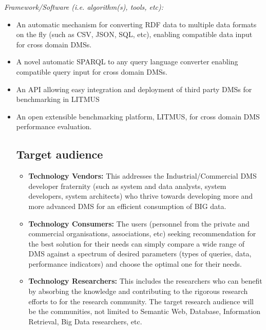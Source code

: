 \documentclass{llncs}
\newcommand{\todoproofread}[3]{
    \todoitemtemplate{#1}{#2}{Please proof read above section; #3}{inline}{yellow}
}
\newcommand{\todoitemtemplate}[5]{%
\todo[#4,color=#5,caption=X]{{#1}{ \textbf{{\tiny{for}} #2}:}{#3}}%
}
\begin{document}
         \textit{Framework/Software (i.e. algorithm(s), tools, etc):} 
        \begin{itemize}[nosep]
            \item An automatic mechanism for converting RDF data to multiple data formats on the fly (such as CSV, JSON, SQL, etc), enabling compatible data input for cross domain DMSs. 
            \item A novel automatic SPARQL to any query language converter enabling compatible query input for cross domain DMSs.
            \item An API allowing easy integration and deployment of third party DMSs for benchmarking in LITMUS
            \item An open extensible benchmarking platform, LITMUS, for cross domain DMS performance evaluation.

    \subsection{Target audience}
        \begin{itemize}[nosep]
            \item \textbf{Technology Vendors:}
            This addresses the Industrial/Commercial DMS developer fraternity (such as system and data analysts, system developers, system architects) who thrive towards developing more and more advanced DMS for an efficient consumption of BIG data.
            \item \textbf{Technology Consumers:}
            The users (personnel from the private and commercial organisations, associations, etc) seeking recommendation for the best solution for their needs can simply compare a wide range of DMS against a spectrum of desired parameters (types of queries, data, performance indicators) and choose the optimal one for their needs. 
            \item \textbf{Technology Researchers:}
            This includes the researchers who can benefit by absorbing the knowledge and contributing to the rigorous research efforts to for the research community. The target research audience will be the communities, not limited to Semantic Web, Database, Information Retrieval, Big Data researchers, etc.
        \end{itemize}



\end{itemize}
\end{document}
